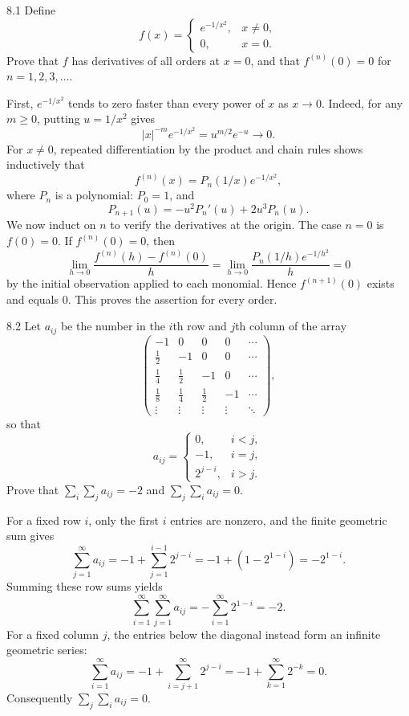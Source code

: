 \documentclass[11pt, oneside]{article}
\begin{document}
\begin{exercise}{8.1}
Define
\[
 f(x)=\begin{cases}e^{-1/x^2}, &x\ne0, \\0, &x=0.\end{cases}
\]
Prove that $f$ has derivatives of all orders at $x=0$, and that $f^{(n)}(0)=0$ for $n=1, 2, 3, \ldots$.
\end{exercise}
\begin{solution}
First, $e^{-1/x^2}$ tends to zero faster than every power of $x$ as $x\to0$. Indeed, for any $m\ge0$, putting $u=1/x^2$ gives
\[
 |x|^{-m}e^{-1/x^2}=u^{m/2}e^{-u}\longrightarrow0.
\]
For $x\ne0$, repeated differentiation by the product and chain rules shows inductively that
\[
 f^{(n)}(x)=P_n(1/x)e^{-1/x^2},
\]
where $P_n$ is a polynomial: $P_0=1$, and
\[
 P_{n+1}(u)=-u^2P_n'(u)+2u^3P_n(u).
\]
We now induct on $n$ to verify the derivatives at the origin. The case $n=0$ is $f(0)=0$. If $f^{(n)}(0)=0$, then
\[
 \lim_{h\to0}\frac{f^{(n)}(h)-f^{(n)}(0)}h
 =\lim_{h\to0}\frac{P_n(1/h)e^{-1/h^2}}h=0
\]
by the initial observation applied to each monomial. Hence $f^{(n+1)}(0)$ exists and equals $0$. This proves the assertion for every order.
\end{solution}

\begin{exercise}{8.2}
Let $a_{ij}$ be the number in the $i$th row and $j$th column of the array
\[
\begin{pmatrix}
-1&0&0&0&\cdots\\
\frac12&-1&0&0&\cdots\\
\frac14&\frac12&-1&0&\cdots\\
\frac18&\frac14&\frac12&-1&\cdots\\
\vdots&\vdots&\vdots&\vdots&\ddots
\end{pmatrix},
\]
so that
\[
 a_{ij}=\begin{cases}0, &i<j, \\-1, &i=j, \\2^{j-i}, &i>j.\end{cases}
\]
Prove that $\displaystyle\sum_i\sum_j a_{ij}=-2$ and $\displaystyle\sum_j\sum_i a_{ij}=0$.
\end{exercise}
\begin{solution}
For a fixed row $i$, only the first $i$ entries are nonzero, and the finite geometric sum gives
\[
 \sum_{j=1}^\infty a_{ij}=-1+\sum_{j=1}^{i-1}2^{j-i}
 =-1+(1-2^{1-i})=-2^{1-i}.
\]
Summing these row sums yields
\[
 \sum_{i=1}^\infty\sum_{j=1}^\infty a_{ij}
 =-\sum_{i=1}^\infty2^{1-i}=-2.
\]
For a fixed column $j$, the entries below the diagonal instead form an infinite geometric series:
\[
 \sum_{i=1}^\infty a_{ij}=-1+\sum_{i=j+1}^\infty2^{j-i}
 =-1+\sum_{k=1}^\infty2^{-k}=0.
\]
Consequently $\sum_j\sum_i a_{ij}=0$.
\end{solution}
\end{document}

